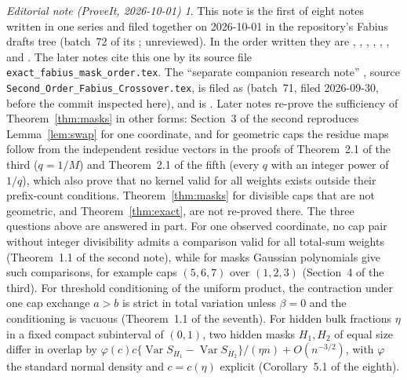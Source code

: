 \documentclass[11pt,a4paper]{article}
\theoremstyle{remark}\newtheorem*{ednote}{Editorial note (ProveIt, 2026-10-01)}
\begin{document}
\begin{ednote}
This note is the first of eight notes written in one series and filed together on 2026-10-01 in the repository's Fabius drafts tree (batch~72 of its ; unreviewed). In the order written they are , , , , , ,  and . 
The later notes cite this one by its source file
\texttt{exact\_fabius\_mask\_order.tex}. The ``separate companion research
note'' \cite{second}, source \texttt{Second\_Order\_Fabius\_Crossover.tex},
is filed as  (batch~71, filed 2026-09-30, before the
commit inspected here), and \cite{critical} is .
Later notes re-prove the sufficiency of Theorem~\ref{thm:masks} in other
forms: Section~3 of the second reproduces Lemma~\ref{lem:swap} for one
coordinate, and for geometric caps the residue maps follow from the
independent residue vectors in the proofs of Theorem~2.1 of the third
($q=1/M$) and Theorem~2.1 of the fifth (every $q$ with an integer power of
$1/q$), which also prove that no kernel valid for all weights exists outside
their prefix-count conditions. Theorem~\ref{thm:masks} for divisible caps that
are not geometric, and Theorem~\ref{thm:exact}, are not re-proved there. The
three questions above are answered in part. For one observed coordinate, no
cap pair without integer divisibility admits a comparison valid for all
total-sum weights (Theorem~1.1 of the second note), while for masks Gaussian
polynomials give such comparisons, for example caps $(5,6,7)$ over $(1,2,3)$
(Section~4 of the third). For threshold conditioning of the uniform product,
the contraction under one cap exchange $a>b$ is strict in total variation
unless $\beta=0$ and the conditioning is vacuous (Theorem~1.1 of the
seventh). For hidden bulk fractions $\eta$ in a fixed compact subinterval of
$(0,1)$, two hidden masks $H_1,H_2$ of equal size differ in overlap by
$\varphi(c)c\{\operatorname{Var}S_{H_1}-\operatorname{Var}S_{H_2}\}/(\eta n)
+O(n^{-3/2})$, with $\varphi$ the standard normal density and $c=c(\eta)$
explicit (Corollary~5.1 of the eighth).
\end{ednote}
\end{document}
